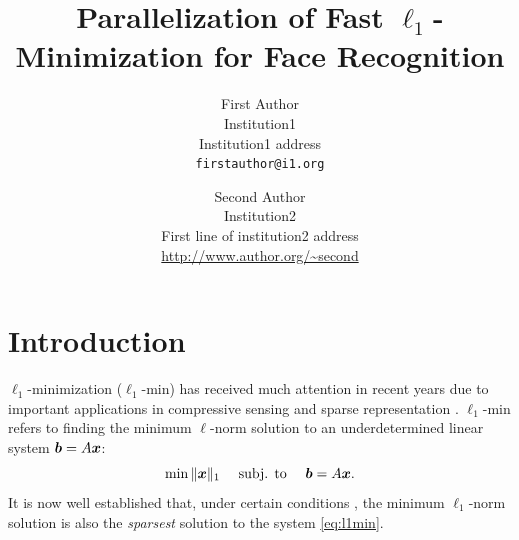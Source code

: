\documentclass[10pt,twocolumn,letterpaper]{article}
\begin{document}
\title{Parallelization of Fast $\ell_1$-Minimization for Face Recognition
}

\author{First Author\\
Institution1\\
Institution1 address\\
{\tt\small firstauthor@i1.org}
\and
Second Author\\
Institution2\\
First line of institution2 address\\
{\small\url{http://www.author.org/~second}}
}

\maketitle

\begin{abstract}

\end{abstract}

\section{Introduction} 
$\ell_1$-minimization ($\ell_1$-min) has received much attention in recent
years due to important applications in compressive sensing
\cite{BrucksteinA2007} and sparse representation \cite{WrightJ2010-PIEEE}.  
$\ell_1$-min refers to finding the minimum $\ell$-norm solution to an
underdetermined linear system ${\boldsymbol{b}}=A{\boldsymbol{x}}$:
\begin{equation}
\min \|{\boldsymbol{x}}\|_1\quad \mbox{ subj. to }\quad {\boldsymbol{b}} = A{\boldsymbol{x}}.
\label{eq:l1min}
\end{equation}
It is now well established that, under certain conditions
\cite{CandesE2005-IT_1,DonohoD2004}, the minimum $\ell_1$-norm solution is also
the \emph{sparsest} solution to the system \eqref{eq:l1min}.
\end{document}
